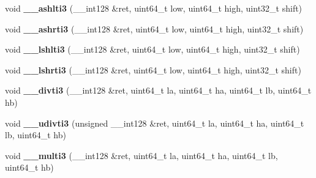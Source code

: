 \begin{DoxyCompactItemize}
\item 
\mbox{\label{classaacio_1_1chain_1_1compiler__builtins_a090f4ad3891cb8f3bf28c342dff395f9}} 
void {\bfseries \+\_\+\+\_\+ashlti3} (\+\_\+\+\_\+int128 \&ret, uint64\+\_\+t low, uint64\+\_\+t high, uint32\+\_\+t shift)
\item 
\mbox{\label{classaacio_1_1chain_1_1compiler__builtins_afa9d1f60fad9212aeda09024a1f46693}} 
void {\bfseries \+\_\+\+\_\+ashrti3} (\+\_\+\+\_\+int128 \&ret, uint64\+\_\+t low, uint64\+\_\+t high, uint32\+\_\+t shift)
\item 
\mbox{\label{classaacio_1_1chain_1_1compiler__builtins_a4868cb30fae2ccdd0fa7f1639d6edea9}} 
void {\bfseries \+\_\+\+\_\+lshlti3} (\+\_\+\+\_\+int128 \&ret, uint64\+\_\+t low, uint64\+\_\+t high, uint32\+\_\+t shift)
\item 
\mbox{\label{classaacio_1_1chain_1_1compiler__builtins_a40589ef535d51a0248c9a439a4a245f3}} 
void {\bfseries \+\_\+\+\_\+lshrti3} (\+\_\+\+\_\+int128 \&ret, uint64\+\_\+t low, uint64\+\_\+t high, uint32\+\_\+t shift)
\item 
\mbox{\label{classaacio_1_1chain_1_1compiler__builtins_a8fa51965afdf7b43ed095939958f3e17}} 
void {\bfseries \+\_\+\+\_\+divti3} (\+\_\+\+\_\+int128 \&ret, uint64\+\_\+t la, uint64\+\_\+t ha, uint64\+\_\+t lb, uint64\+\_\+t hb)
\item 
\mbox{\label{classaacio_1_1chain_1_1compiler__builtins_a76e0cd5bbba73c76e3d0325ac3bc5aa6}} 
void {\bfseries \+\_\+\+\_\+udivti3} (unsigned \+\_\+\+\_\+int128 \&ret, uint64\+\_\+t la, uint64\+\_\+t ha, uint64\+\_\+t lb, uint64\+\_\+t hb)
\item 
\mbox{\label{classaacio_1_1chain_1_1compiler__builtins_a39d0498369ca1286927db00788e9d03e}} 
void {\bfseries \+\_\+\+\_\+multi3} (\+\_\+\+\_\+int128 \&ret, uint64\+\_\+t la, uint64\+\_\+t ha, uint64\+\_\+t lb, uint64\+\_\+t hb)
\item 

\end{DoxyCompactItemize}

